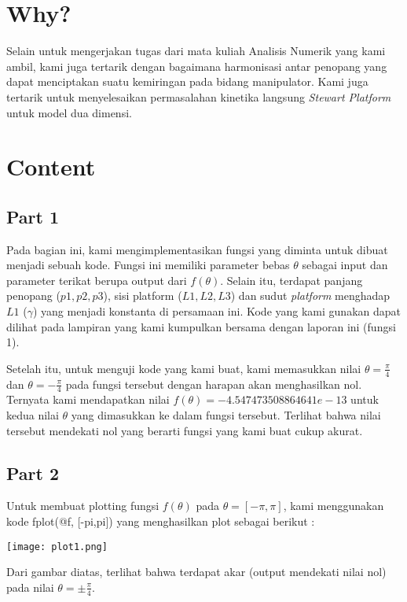 \documentclass[11pt]{article}
\begin{document}
\begin{multicols}{2}
\section{Why?}
\label{sec:Why}
Selain untuk mengerjakan tugas dari mata kuliah Analisis Numerik yang kami ambil, kami juga tertarik dengan bagaimana harmonisasi antar penopang yang dapat menciptakan suatu kemiringan pada bidang manipulator. Kami juga tertarik untuk menyelesaikan permasalahan kinetika langsung \textit{Stewart Platform} untuk model dua dimensi.

\section{Content}
\label{sec:Content}
\subsection{Part 1}
Pada bagian ini, kami mengimplementasikan fungsi yang diminta untuk dibuat menjadi sebuah kode. Fungsi ini memiliki parameter bebas $\theta$ sebagai input dan parameter terikat berupa output dari $f(\theta)$. Selain itu, terdapat panjang penopang ($p1, p2, p3$), sisi platform ($L1, L2, L3$) dan sudut \textit{platform} menghadap $L1$ ($\gamma$) yang menjadi konstanta di persamaan ini. Kode yang kami gunakan dapat dilihat pada lampiran yang kami kumpulkan bersama dengan laporan ini (fungsi 1).

\medskip

Setelah itu, untuk menguji kode yang kami buat, kami memasukkan nilai $\theta = \frac{\pi}{4}$ dan $\theta = -\frac{\pi}{4}$ pada fungsi tersebut dengan harapan akan menghasilkan nol. Ternyata kami mendapatkan nilai $f(\theta) = -4.547473508864641e-13$ untuk kedua nilai $\theta$ yang dimasukkan ke dalam fungsi tersebut. Terlihat bahwa nilai tersebut mendekati nol yang berarti fungsi yang kami buat cukup akurat.

\subsection{Part 2}
Untuk membuat plotting fungsi $f(\theta)$ pada $\theta = [-\pi, \pi]$, kami menggunakan kode fplot(@f, [-pi,pi])  yang menghasilkan plot sebagai berikut :

\texttt{[image: plot1.png]}

\medskip

Dari gambar diatas, terlihat bahwa terdapat akar (output mendekati nilai nol) pada nilai $\theta = \pm\frac{\pi}{4}$.


\end{multicols}
\end{document}
